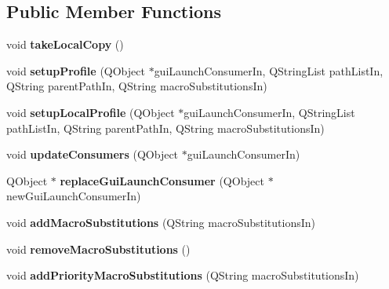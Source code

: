 \subsection*{Public Member Functions}
\begin{DoxyCompactItemize}
\item 
\hypertarget{classContainerProfile_aa5b6583e82e83be981529929506a7a97}{
void {\bfseries takeLocalCopy} ()}
\label{classContainerProfile_aa5b6583e82e83be981529929506a7a97}

\item 
\hypertarget{classContainerProfile_a5f0e629653b907020b637cb3b2e46770}{
void {\bfseries setupProfile} (QObject $\ast$guiLaunchConsumerIn, QStringList pathListIn, QString parentPathIn, QString macroSubstitutionsIn)}
\label{classContainerProfile_a5f0e629653b907020b637cb3b2e46770}

\item 
\hypertarget{classContainerProfile_ab17f938668c578caad9af908a41fd409}{
void {\bfseries setupLocalProfile} (QObject $\ast$guiLaunchConsumerIn, QStringList pathListIn, QString parentPathIn, QString macroSubstitutionsIn)}
\label{classContainerProfile_ab17f938668c578caad9af908a41fd409}

\item 
\hypertarget{classContainerProfile_ab9d4f54da86371dab879cdbf543750c6}{
void {\bfseries updateConsumers} (QObject $\ast$guiLaunchConsumerIn)}
\label{classContainerProfile_ab9d4f54da86371dab879cdbf543750c6}

\item 
\hypertarget{classContainerProfile_a75f5e5d582db66fcee3423638ac45436}{
QObject $\ast$ {\bfseries replaceGuiLaunchConsumer} (QObject $\ast$newGuiLaunchConsumerIn)}
\label{classContainerProfile_a75f5e5d582db66fcee3423638ac45436}

\item 
\hypertarget{classContainerProfile_ae1f30e900c0ecfa79a5a1cfecc5f0d0a}{
void {\bfseries addMacroSubstitutions} (QString macroSubstitutionsIn)}
\label{classContainerProfile_ae1f30e900c0ecfa79a5a1cfecc5f0d0a}

\item 
\hypertarget{classContainerProfile_a477273957a10b9ed4c2a9bac19ba5a6a}{
void {\bfseries removeMacroSubstitutions} ()}
\label{classContainerProfile_a477273957a10b9ed4c2a9bac19ba5a6a}

\item 
\hypertarget{classContainerProfile_a884879dcca1814af0eb0cbe319dd95f2}{
void {\bfseries addPriorityMacroSubstitutions} (QString macroSubstitutionsIn)}
\label{classContainerProfile_a884879dcca1814af0eb0cbe319dd95f2}


\end{DoxyCompactItemize}
